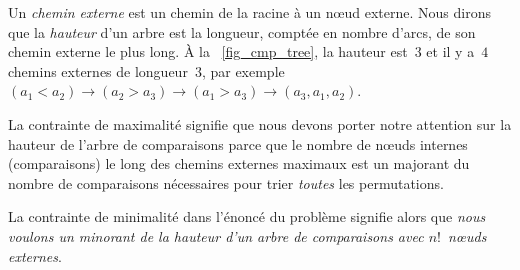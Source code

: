 Un \emph{chemin externe} est un
chemin de la racine à un n{\oe}ud externe. Nous dirons que la
\emph{hauteur} d'un arbre est la
longueur, comptée en nombre d'arcs, de son chemin externe le plus
long. À la \fig~\ref{fig_cmp_tree}, la hauteur est~\(3\) et il y
a~\(4\) chemins externes de longueur~\(3\), par exemple \((a_1 < a_2)
\rightarrow (a_2 > a_3) \rightarrow (a_1 > a_3) \rightarrow
(a_3,a_1,a_2)\).

La contrainte de maximalité signifie que nous devons porter notre
attention sur la hauteur de l'arbre de comparaisons parce que le
nombre de n{\oe}uds internes (comparaisons) le long des chemins
externes maximaux est un majorant du nombre de comparaisons
nécessaires pour trier \emph{toutes} les
permutations.

La contrainte de minimalité dans l'énoncé du problème signifie alors
que \emph{nous voulons un minorant de la hauteur d'un arbre de
  comparaisons avec \(n!\)~n{\oe}uds externes}.

